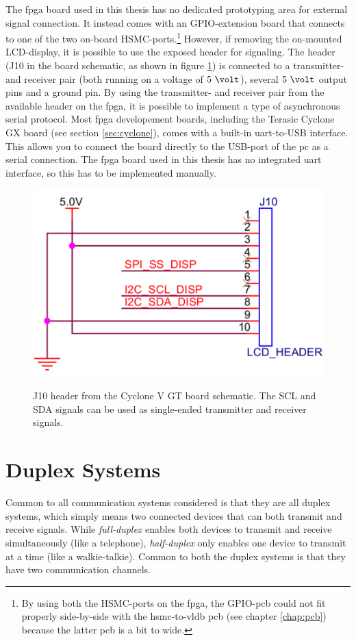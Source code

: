 \documentclass[main.tex]{subfiles}
\begin{document}
The \gls{fpga} board used in this thesis has no dedicated prototyping area for external signal connection. It instead comes with an GPIO-extension board that connects to one of the two on-board HSMC-ports.\footnote{By using both the HSMC-ports on the \gls{fpga}, the GPIO-\gls{pcb} could not fit properly side-by-side with the \acrshort{hsmc}-to-\acrshort{vldb} \acrshort{pcb} (see chapter \ref{chap:pcb}) because the latter \gls{pcb} is a bit to wide.} However, if removing the on-mounted LCD-display, it is possible to use the exposed header for signaling. The header (J10 in the board schematic, as shown in figure \ref{fig:lcdheader}) is connected to a transmitter- and receiver pair (both running on a voltage of $5~\volt$), several $5~\volt$ output pins and a ground pin. By using the transmitter- and receiver pair from the available header on the \gls{fpga}, it is possible to implement a type of asynchronous serial protocol. Most \gls{fpga} developement boards, including the Terasic Cyclone GX board (see section \ref{sec:cyclone}), comes with a built-in \gls{uart}-to-USB interface. This allows you to connect the board directly to the USB-port of the \acrshort{pc} as a serial connection. The \gls{fpga} board used in this thesis has no integrated \gls{uart} interface, so this has to be implemented manually.

\begin{figure}[] %
\includegraphics[width=0.5\linewidth]{../img/lcdheader.pdf}  \\[0.1 cm]
\caption{J10 header from the Cyclone V GT board schematic. The SCL and SDA signals can be used as single-ended transmitter and receiver signals.}
\label{fig:lcdheader}
\end{figure}

\section{Duplex Systems}

Common to all communication systems considered is that they are all duplex systems, which simply means two connected devices that can both transmit and receive signals. While \textit{full-duplex} enables both devices to transmit and receive simultaneously (like a telephone), \textit{half-duplex} only enables one device to transmit at a time (like a walkie-talkie). Common to both the duplex systems is that they have two communication channels. 
\end{document}
